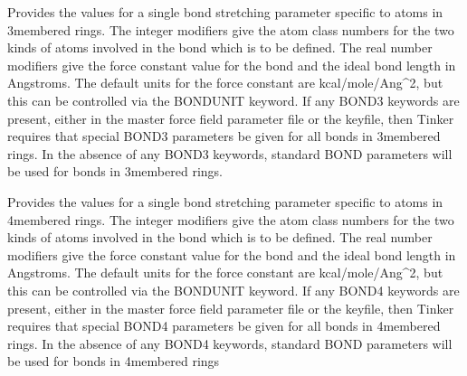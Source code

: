 \documentclass[letterpaper,11pt,english]{sphinxmanual}
\begin{document}
\ignorespaces {}\label{\detokenize{text/keywords:key-bond3}}\begin{description}
\sphinxAtStartPar
Provides the values for a single bond stretching parameter specific to atoms in 3\sphinxhyphen{}membered rings. The integer modifiers give the atom class numbers for the two kinds of atoms involved in the bond which is to be defined. The real number modifiers give the force constant value for the bond and the ideal bond length in Angstroms. The default units for the force constant are kcal/mole/Ang\textasciicircum{}2, but this can be controlled via the BONDUNIT keyword. If any BOND3 keywords are present, either in the master force field parameter file or the keyfile, then Tinker requires that special BOND3 parameters be given for all bonds in 3\sphinxhyphen{}membered rings. In the absence of any BOND3 keywords, standard BOND parameters will be used for bonds in 3\sphinxhyphen{}membered rings.

\end{description}

\ignorespaces {}\label{\detokenize{text/keywords:key-bond4}}\begin{description}
\sphinxAtStartPar
Provides the values for a single bond stretching parameter specific to atoms in 4\sphinxhyphen{}membered rings. The integer modifiers give the atom class numbers for the two kinds of atoms involved in the bond which is to be defined. The real number modifiers give the force constant value for the bond and the ideal bond length in Angstroms. The default units for the force constant are kcal/mole/Ang\textasciicircum{}2, but this can be controlled via the BONDUNIT keyword. If any BOND4 keywords are present, either in the master force field parameter file or the keyfile, then Tinker requires that special BOND4 parameters be given for all bonds in 4\sphinxhyphen{}membered rings. In the absence of any BOND4 keywords, standard BOND parameters will be used for bonds in 4\sphinxhyphen{}membered rings

\end{description}
\end{document}
